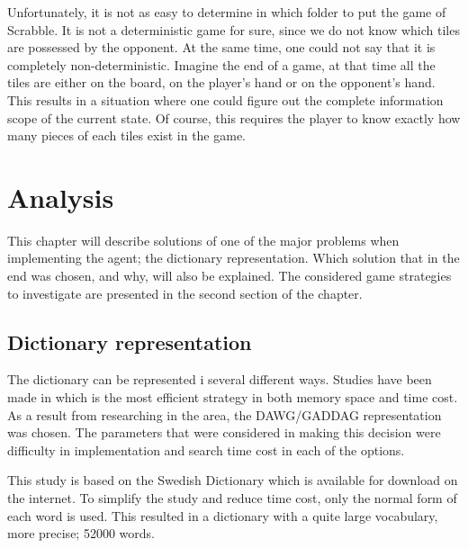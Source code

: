 \documentclass[a4paper, 12pt]{report}
\begin{document}
Unfortunately, it is not as easy to determine in which folder to put the game of Scrabble. It is not a deterministic game for sure, since we do not know which tiles are possessed by the opponent. At the same time, one could not say that it is completely non-deterministic. Imagine the end of a game, at that time all the tiles are either on the board, on the player's hand or on the opponent's hand. This results in a situation where one could figure out the complete information scope of the current state. Of course, this requires the player to know exactly how many pieces of each tiles exist in the game.

\chapter{Analysis}
This chapter will describe solutions of one of the major problems when implementing the agent; the dictionary representation. Which solution that in the end was chosen, and why, will also be explained. The considered game strategies to investigate are presented in the second section of the chapter.

\section{Dictionary representation}
The dictionary can be represented i several different ways. Studies have been made in which is the most efficient strategy in both memory space and time cost. As a result from researching in the area, the DAWG/GADDAG representation was chosen. The parameters that were considered in making this decision were difficulty in implementation and search time cost in each of the options.

This study is based on the Swedish Dictionary which is available for download on the internet. To simplify the study and reduce time cost, only the normal form of each word is used. This resulted in a dictionary with a quite large vocabulary, more precise; 52000 words.
\end{document}
